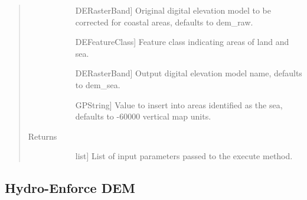 \documentclass[letterpaper,10pt,english]{sphinxmanual}
\begin{document}
\begin{fulllineitems}
\begin{fulllineitems}
\begin{quote}
\begin{description}
\begin{description}
\item[{}] \leavevmode{[}DERasterBand{]}
Original digital elevation model to be corrected for coastal areas, defaults to dem\_raw.

\item[{}] \leavevmode{[}DEFeatureClass{]}
Feature class indicating areas of land and sea.

\item[{}] \leavevmode{[}DERasterBand{]}
Output digital elevation model name, defaults to dem\_sea.

\item[{}] \leavevmode{[}GPString{]}
Value to insert into areas identified as the sea, defaults to -60000 vertical map units.

\end{description}

\item[{Returns}] \leavevmode\begin{description}
\item[{}] \leavevmode{[}list{]}
List of input parameters passed to the execute method.

\end{description}

\end{description}\end{quote}

\end{fulllineitems}


\end{fulllineitems}



\subsection{Hydro-Enforce DEM}
\label{\detokenize{StreamStats_DataPrep:hydro-enforce-dem}}
\end{document}
